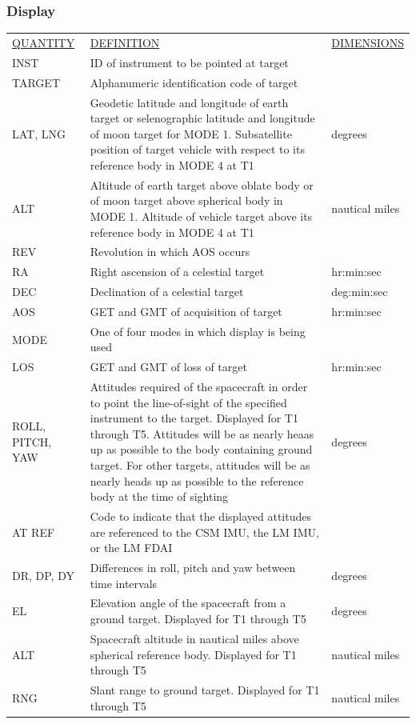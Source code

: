 \documentclass[11pt]{article} %
\begin{document}
\subsubsection{Display}
\begin{center}
\begin{tabular}{ L{2.4cm} L{7.1cm} L{3cm} }
\underline{QUANTITY} & \underline{DEFINITION} & \underline{DIMENSIONS} \\
INST&ID of instrument to be pointed at target&\\
TARGET&Alphanumeric identification code of target&\\
LAT, LNG&Geodetic latitude and longitude of earth target or selenographic latitude and longitude of moon target for MODE 1. Subsatellite position of target vehicle with respect to its reference body in MODE 4 at T1&degrees\\
ALT&Altitude of earth target above oblate body or of moon target above spherical body in MODE 1. Altitude of vehicle target above its reference body in MODE 4 at T1&nautical miles\\
REV&Revolution in which AOS occurs&\\
RA&Right ascension of a celestial target&hr:min:sec\\
DEC&Declination of a celestial target&deg:min:sec\\
AOS&GET and GMT of acquisition of target&hr:min:sec\\
MODE&One of four modes in which display is being used&\\
LOS&GET and GMT of loss of target&hr:min:sec\\
ROLL, PITCH, YAW&Attitudes required of the spacecraft in order to point the line-of-sight of the specified instrument to the target. Displayed for T1 through T5. Attitudes will be as nearly heaas up as possible to the body containing ground target. For other targets, attitudes will be as nearly heads up as possible to the reference body at the time of sighting&degrees\\
AT REF&Code to indicate that the displayed attitudes are referenced to the CSM IMU, the LM IMU, or the LM FDAI&\\
DR, DP, DY&Differences in roll, pitch and yaw between time intervals&degrees\\
EL&Elevation angle of the spacecraft from a ground target. Displayed for T1 through T5&degrees\\
ALT&Spacecraft altitude in nautical miles above spherical reference body. Displayed for T1 through T5&nautical miles\\
RNG&Slant range to ground target. Displayed for T1 through T5&nautical miles\\
\end{tabular}
\end{center}
\end{document}
